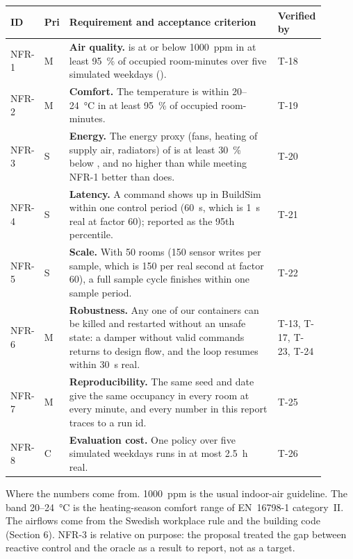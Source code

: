 \begin{longtable}[]{@{}L{0.07\linewidth}L{0.04\linewidth}L{0.66\linewidth}L{0.13\linewidth}@{}}
\toprule
\textbf{ID} & \textbf{Pri} & \textbf{Requirement and acceptance criterion} & \textbf{Verified by} \\
\midrule
\endhead
NFR-1 & M & \textbf{Air quality.} \COtwo{} is at or below 1000~ppm in at least
95~\% of occupied room-minutes over five simulated weekdays
(). & T-18 \\
NFR-2 & M & \textbf{Comfort.} The temperature is within 20--24~°C in at least
95~\% of occupied room-minutes. & T-19 \\
NFR-3 & S & \textbf{Energy.} The energy proxy (fans, heating of supply air,
radiators) of  is at least 30~\% below , and
no higher than  while meeting NFR-1 better than
 does. & T-20 \\
NFR-4 & S & \textbf{Latency.} A command shows up in BuildSim within one
control period (60~s, which is 1~s real at factor 60); reported as the 95th
percentile. & T-21 \\
NFR-5 & S & \textbf{Scale.} With 50 rooms (150 sensor writes per sample,
which is 150 per real second at factor 60), a full sample cycle finishes
within one sample period. & T-22 \\
NFR-6 & M & \textbf{Robustness.} Any one of our containers can be killed and
restarted without an unsafe state: a damper without valid commands returns to
design flow, and the loop resumes within 30~s real. & T-13, T-17, T-23, T-24 \\
NFR-7 & M & \textbf{Reproducibility.} The same seed and date give the same
occupancy in every room at every minute, and every number in this report
traces to a run id. & T-25 \\
NFR-8 & C & \textbf{Evaluation cost.} One policy over five simulated weekdays
runs in at most 2.5~h real. & T-26 \\
\bottomrule
\end{longtable}

Where the numbers come from. 1000~ppm is the usual indoor-air guideline. The
band 20--24~°C is the heating-season comfort range of EN~16798-1 category~II.
The airflows come from the Swedish workplace rule and the building code
(Section 6). NFR-3 is relative on purpose: the proposal treated the gap between
reactive control and the oracle as a result to report, not as a target.

